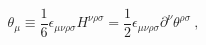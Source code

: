 \begin{equation}\label{2.6}
\theta_\mu \equiv \frac{1}{6} \epsilon_{\mu \nu \rho \sigma}
H^{\nu \rho \sigma} = \frac{1}{2} \epsilon_{\mu \nu \rho \sigma}
\partial^\nu \theta^{\rho \sigma} ~,
\end{equation}

